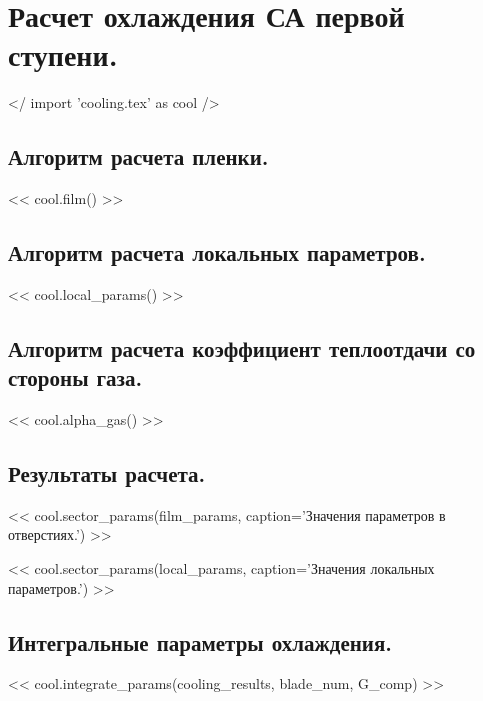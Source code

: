 \documentclass[a4paper,10pt]{article}
\begin{document}
\section{Расчет охлаждения СА первой ступени.}

    </ import 'cooling.tex' as cool />

    \subsection{Алгоритм расчета пленки.}

    << cool.film() >>

    \subsection{Алгоритм расчета локальных параметров.}

    << cool.local_params() >>

    \subsection{Алгоритм расчета коэффициент теплоотдачи со стороны газа.}

    << cool.alpha_gas() >>

    \subsection{Результаты расчета.}

    << cool.sector_params(film_params, caption='Значения параметров в отверстиях.') >>

    << cool.sector_params(local_params, caption='Значения локальных параметров.') >>

    \subsection{Интегральные параметры охлаждения.}

    << cool.integrate_params(cooling_results, blade_num, G_comp) >>
\end{document}
